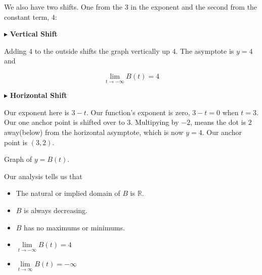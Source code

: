 \documentclass{ximera}
\begin{document}
\begin{example}
\begin{explanation}
We also have two shifts. One from the $3$ in the exponent and the second from the constant term, $4$:




$\blacktriangleright$ \textbf{Vertical Shift}


Adding $4$ to the outside shifts the graph vertically up $4$.  The asymptote is $y = 4$ and 

\[ \lim\limits_{t \to -\infty} B(t) = 4 \]



$\blacktriangleright$ \textbf{Horizontal Shift}

Our exponent here is $3 - t$.  Our function's exponent is zero, $3-t=0$ when $t=3$. Our one anchor point is shifted over to $3$.  Multipying by $-2$, means the dot is $2$ away(below) from the horizontal asymptote, which is now $y=4$.  Our anchor point is $(3, 2)$.








Graph of $y = B(t)$.

\begin{image}
\end{image}




Our analysis tells us that 

\begin{itemize}
\item The natural or implied domain of $B$ is $\mathbb{R}$.
\item $B$ is always decreasing.
\item $B$ has no maximums or minimums.
\item $\lim\limits_{t \to -\infty} B(t) = 4$
\item $\lim\limits_{t \to \infty} B(t) = -\infty$
\end{itemize}



\end{explanation}
\end{example}
\end{document}
